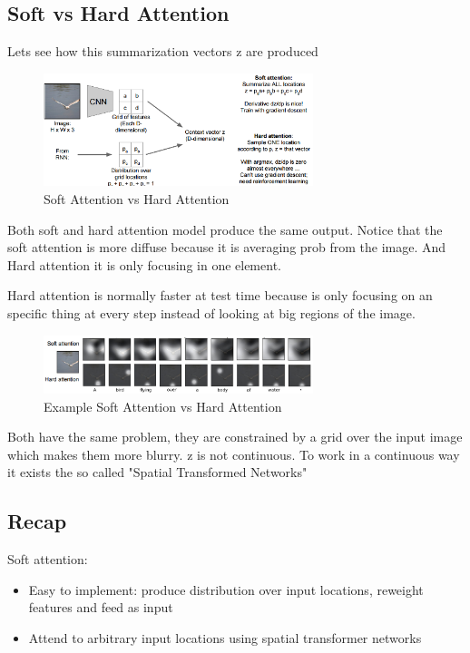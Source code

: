 \documentclass{article}
\begin{document}
	
	\subsection{Soft vs Hard Attention}
	Lets see how this summarization vectors z are produced
	\begin{figure}[h]
		\centering
		\includegraphics[width=0.7\textwidth]{Images/attention_models/2.png}
		\caption{Soft Attention vs Hard Attention}
	\end{figure}
	
	Both soft and hard attention model produce the same output. Notice that the soft attention is more diffuse because it is averaging prob from the image. And Hard attention it is only focusing in one element.
	
	Hard attention is normally faster at test time because is only focusing on an specific thing at every step instead of looking at big regions of the image.
	
	\begin{figure}[h]
		\centering
		\includegraphics[width=0.7\textwidth]{Images/attention_models/3.png}
		\caption{Example Soft Attention vs Hard Attention}
	\end{figure}
	
	Both have the same problem, they are constrained by a grid  over the input image which makes them more blurry. z is not continuous. To work in a continuous way it exists the so called "Spatial Transformed Networks"
	
	
	\subsection{Recap}
	Soft attention:
	\begin{itemize}
		\item Easy to implement: produce distribution over input locations, reweight features and feed as input
		\item Attend to arbitrary input locations using spatial transformer networks
	\end{itemize}
	
\end{document}
